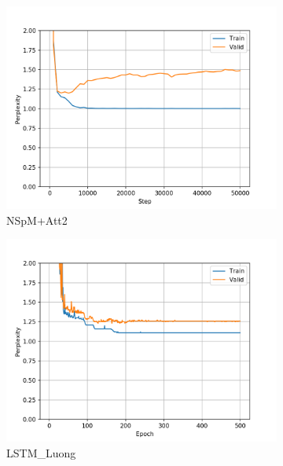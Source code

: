 \begin{figure}[H]
\begin{subfigure}{0.45\textwidth}
\includegraphics[width=\textwidth]{../results/monument2_1/run1/neural_sparql_machine_luong_attention/ppls.png} 
\caption{NSpM+Att2}
\label{fig:monu1 nsm-luo ppl}
\end{subfigure}
\hfill
\begin{subfigure}{0.45\textwidth}
\includegraphics[width=\textwidth]{../results/monument2_1/run1/lstm_luong_wmt_en_de/ppls.png}
\caption{LSTM\_Luong}
\label{fig:monu1 lstm ppl}
\end{subfigure}
\hfill
\begin{subfigure}{0.45\textwidth}

\end{subfigure}
\end{figure}
